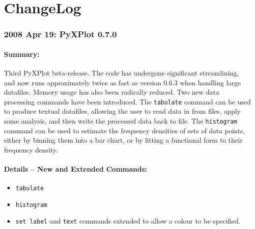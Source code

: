 %
%
%
%
%



\chapter{ChangeLog}

\subsection*{2008 Apr 19: PyXPlot 0.7.0}

\subsubsection*{Summary:}

Third PyXPlot beta-release. The code has undergone significant streamlining,
and now runs approximately twice as fast as version 0.6.3 when handling large
datafiles. Memory usage has also been radically reduced. Two new data
processing commands have been introduced. The {\tt tabulate} command can be
used to produce textual datafiles, allowing the user to read data in from
files, apply some analysis, and then write the processed data back to file. The
{\tt histogram} command can be used to estimate the frequency densities of sets
of data points, either by binning them into a bar chart, or by fitting a
functional form to their frequency density.

\subsubsection*{Details -- New and Extended Commands:}

\begin{itemize}
\item {\tt tabulate}
\item {\tt histogram}
\item {\tt set label} and {\tt text} commands extended to allow a colour to be
specified.
\end{itemize}

